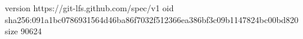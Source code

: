 version https://git-lfs.github.com/spec/v1
oid sha256:091a1bc0786931564d46ba86f7032f512366ea386bf3c09b1147824bc00bd820
size 90624
